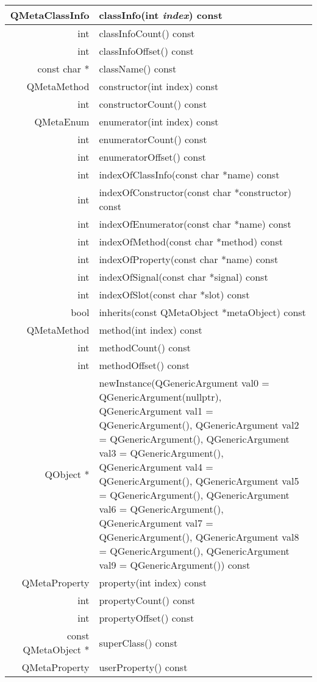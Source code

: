 \begin{longtable}{|r|m{28em}|}   
\hline
QMetaClassInfo	& classInfo(int \emph{index}) const \\ 
\hline
int &	classInfoCount() const \\
\hline
int	&classInfoOffset() const\\
\hline
const char *	&className() const\\
\hline
QMetaMethod	&constructor(int index) const\\
\hline
int	&constructorCount() const\\
\hline
QMetaEnum	&enumerator(int index) const\\
\hline
int	&enumeratorCount() const\\
\hline
int	&enumeratorOffset() const\\
\hline
int&	indexOfClassInfo(const char *name) const\\
\hline
int	&indexOfConstructor(const char *constructor) const\\
\hline
int	&indexOfEnumerator(const char *name) const\\
\hline
int	&indexOfMethod(const char *method) const\\
\hline
int	&indexOfProperty(const char *name) const\\
\hline
int	&indexOfSignal(const char *signal) const\\
\hline
int&	indexOfSlot(const char *slot) const\\
\hline
bool	&inherits(const QMetaObject *metaObject) const\\
\hline
QMetaMethod	&method(int index) const\\
\hline
int	&methodCount() const\\
\hline
int	&methodOffset() const\\
\hline
QObject *	&newInstance(QGenericArgument val0 = QGenericArgument(nullptr), QGenericArgument val1 = QGenericArgument(), QGenericArgument val2 = QGenericArgument(), QGenericArgument val3 = QGenericArgument(), QGenericArgument val4 = QGenericArgument(), QGenericArgument val5 = QGenericArgument(), QGenericArgument val6 = QGenericArgument(), QGenericArgument val7 = QGenericArgument(), QGenericArgument val8 = QGenericArgument(), QGenericArgument val9 = QGenericArgument()) const\\
\hline
QMetaProperty	&property(int index) const\\
\hline
int&	propertyCount() const\\
\hline
int	&propertyOffset() const\\
\hline
const QMetaObject *	&superClass() const\\
\hline
QMetaProperty	&userProperty() const\\
\hline
\end{longtable}



